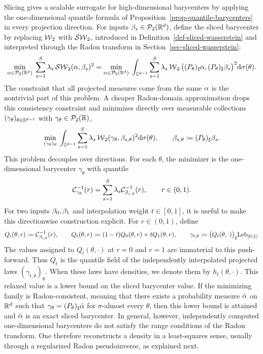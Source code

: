 Slicing gives a scalable surrogate for high-dimensional barycenters by applying the one-dimensional quantile formula of Proposition~\ref{prop-quantile-barycenters} in every projection direction. For inputs $\beta_s\in\mathcal{P}_2(\mathbb{R}^d)$, define the sliced barycenter by replacing $\operatorname{\mathcal{W}}_2$ with $\operatorname{\mathcal{SW}}_2$, introduced in Definition~\ref{def-sliced-wasserstein} and interpreted through the Radon transform in Section~\ref{sec-sliced-wasserstein}:
\[
	\underset{\alpha\in\mathcal{P}_2(\mathbb{R}^d)}{\min}\;
	\sum_{s=1}^S\lambda_s\operatorname{\mathcal{SW}}_2(\alpha,\beta_s)^2
	=
	\underset{\alpha\in\mathcal{P}_2(\mathbb{R}^d)}{\min}\;
	\int_{\mathbb{S}^{d-1}}
	\sum_{s=1}^S\lambda_s
	\operatorname{\mathcal{W}}_2\big((P_\theta)_\sharp\alpha,(P_\theta)_\sharp\beta_s\big)^2
	\mathrm{d}\sigma(\theta).
\]
The constraint that all projected measures come from the same $\alpha$ is the nontrivial part of this problem. A cheaper Radon-domain approximation drops this consistency constraint and minimizes directly over measurable collections $(\gamma_\theta)_{\theta\in\mathbb{S}^{d-1}}$ with $\gamma_\theta\in\mathcal{P}_2(\mathbb{R})$,
\[
	\underset{(\gamma_\theta)_\theta}{\min}\;
	\int_{\mathbb{S}^{d-1}}
	\sum_{s=1}^S\lambda_s
	\operatorname{\mathcal{W}}_2(\gamma_\theta,\beta_{s,\theta})^2
	\mathrm{d}\sigma(\theta),
	\qquad
	\beta_{s,\theta}\coloneqq(P_\theta)_\sharp\beta_s.
\]
This problem decouples over directions. For each $\theta$, the minimizer is the one-dimensional barycenter $\gamma_\theta$ with quantile
\[
	\mathcal{C}_{\gamma_\theta}^{-1}(r)
	=
	\sum_{s=1}^S\lambda_s\mathcal{C}_{\beta_{s,\theta}}^{-1}(r),
	\qquad r\in(0,1).
\]
For two inputs $\beta_0,\beta_1$ and interpolation weight $t\in[0,1]$, it is useful to make this directionwise construction explicit. For $r\in(0,1)$, define
\begin{equation}\label{eq-radon-barycenter-quantile-field}
	Q_i(\theta,r)
	\coloneqq
	\mathcal{C}_{\beta_{i,\theta}}^{-1}(r),
	\qquad
	Q_t(\theta,r)
	\coloneqq
	(1-t)Q_0(\theta,r)+tQ_1(\theta,r),
	\qquad
	\gamma_{t,\theta}
	\coloneqq
	\bigl(Q_t(\theta,\cdot)\bigr)_\sharp\mathrm{Leb}_{[0,1]}.
\end{equation}
The values assigned to $Q_t(\theta,\cdot)$ at $r=0$ and $r=1$ are immaterial to this push-forward. Thus $Q_t$ is the quantile field of the independently interpolated projected laws $(\gamma_{t,\theta})_\theta$. When these laws have densities, we denote them by $h_t(\theta,\cdot)$.
This relaxed value is a lower bound on the sliced barycenter value. If the minimizing family is Radon-consistent, meaning that there exists a probability measure $\bar{\alpha}$ on $\mathbb{R}^d$ such that $\gamma_\theta=(P_\theta)_\sharp\bar{\alpha}$ for $\sigma$-almost every $\theta$, then this lower bound is attained and $\bar{\alpha}$ is an exact sliced barycenter. In general, however, independently computed one-dimensional barycenters do not satisfy the range conditions of the Radon transform. One therefore reconstructs a density in a least-squares sense, usually through a regularized Radon pseudoinverse, as explained next.

